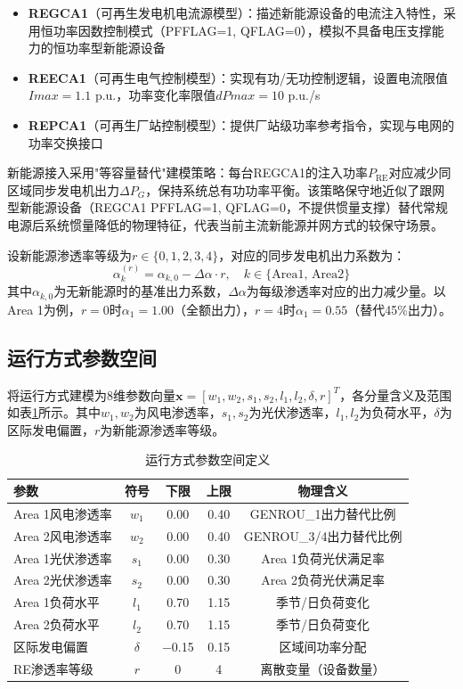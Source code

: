 \documentclass[a4paper,11pt]{ctexart}
\newcommand{\bx}{\mathbf{x}}
\begin{document}
\begin{itemize}
    \item \textbf{REGCA1}（可再生发电机电流源模型）：描述新能源设备的电流注入特性，采用恒功率因数控制模式（PFFLAG=1, QFLAG=0），模拟不具备电压支撑能力的恒功率型新能源设备
    \item \textbf{REECA1}（可再生电气控制模型）：实现有功/无功控制逻辑，设置电流限值$Imax = 1.1$ p.u.，功率变化率限值$dPmax = 10$ p.u./s
    \item \textbf{REPCA1}（可再生厂站控制模型）：提供厂站级功率参考指令，实现与电网的功率交换接口
\end{itemize}

新能源接入采用"等容量替代"建模策略：每台REGCA1的注入功率$P_{\text{RE}}$对应减少同区域同步发电机出力$\Delta P_G$，保持系统总有功功率平衡。该策略保守地近似了跟网型新能源设备（REGCA1 PFFLAG=1, QFLAG=0，不提供惯量支撑）替代常规电源后系统惯量降低的物理特征\cite{hu2023inertia_re}，代表当前主流新能源并网方式的较保守场景。

设新能源渗透率等级为$r \in \{0, 1, 2, 3, 4\}$，对应的同步发电机出力系数为：
\begin{equation}
    \alpha_k^{(r)} = \alpha_{k,0} - \Delta\alpha \cdot r, \quad k \in \{\text{Area1, Area2}\}
    \label{eq:gen_factor}
\end{equation}
其中$\alpha_{k,0}$为无新能源时的基准出力系数，$\Delta\alpha$为每级渗透率对应的出力减少量。以Area 1为例，$r=0$时$\alpha_1 = 1.00$（全额出力），$r=4$时$\alpha_1 = 0.55$（替代45\%出力）。

\subsection{运行方式参数空间}

将运行方式建模为8维参数向量$\bx = [w_1, w_2, s_1, s_2, l_1, l_2, \delta, r]^T$，各分量含义及范围如表\ref{tab:mode_space}所示。其中$w_1, w_2$为风电渗透率，$s_1, s_2$为光伏渗透率，$l_1, l_2$为负荷水平，$\delta$为区际发电偏置，$r$为新能源渗透率等级。

\begin{table}[htbp]
\centering
\caption{运行方式参数空间定义}
\label{tab:mode_space}
\begin{tabular}{lcccc}
\toprule
参数 & 符号 & 下限 & 上限 & 物理含义 \\
\midrule
Area 1风电渗透率 & $w_1$ & 0.00 & 0.40 & GENROU\_1出力替代比例 \\
Area 2风电渗透率 & $w_2$ & 0.00 & 0.40 & GENROU\_3/4出力替代比例 \\
Area 1光伏渗透率 & $s_1$ & 0.00 & 0.30 & Area 1负荷光伏满足率 \\
Area 2光伏渗透率 & $s_2$ & 0.00 & 0.30 & Area 2负荷光伏满足率 \\
Area 1负荷水平 & $l_1$ & 0.70 & 1.15 & 季节/日负荷变化 \\
Area 2负荷水平 & $l_2$ & 0.70 & 1.15 & 季节/日负荷变化 \\
区际发电偏置 & $\delta$ & $-$0.15 & 0.15 & 区域间功率分配 \\
RE渗透率等级 & $r$ & 0 & 4 & 离散变量（设备数量） \\
\bottomrule
\end{tabular}
\end{table}
\end{document}
